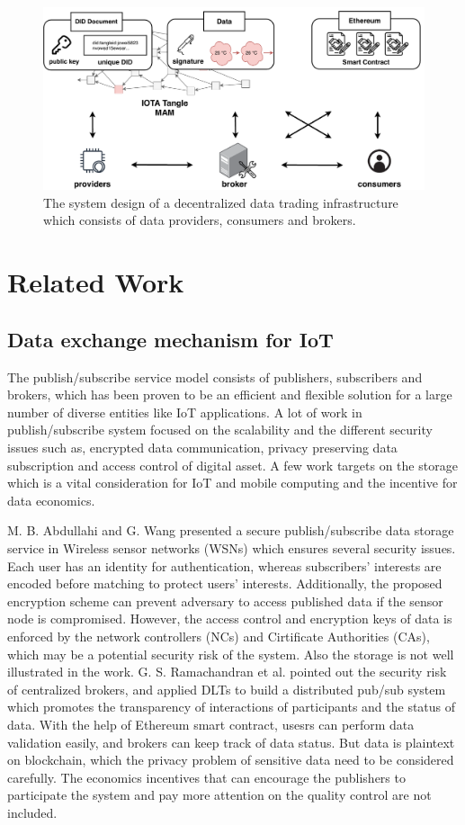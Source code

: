 \documentclass[conference]{IEEEtran}
\begin{document}
\begin{figure}[!t]
    \centering
    \includegraphics[width=3.in]{system_design}
    \caption{The system design of a decentralized data trading infrastructure which consists of data providers, consumers and brokers.}
    \label{fig:system_design}
\end{figure}

\section{Related Work}
\label{section:relatedWork}
\subsection{Data exchange mechanism for IoT}
The publish/subscribe service model consists of publishers, subscribers and brokers, which has been proven\cite{pubSubAnalysis, pubSubAnalysis2} to be an efficient and flexible solution for a large number of diverse entities like IoT applications. A lot of work in publish/subscribe system focused on the scalability and the different security issues such as, encrypted data communication, privacy preserving data subscription and access control of digital asset. A few work targets on the storage which is a vital consideration for IoT and mobile computing and the incentive for data economics.

M. B. Abdullahi and G. Wang\cite{centralPubSub} presented a secure publish/subscribe data storage service in Wireless sensor networks (WSNs) which ensures several security issues. Each user has an identity for authentication, whereas subscribers' interests are encoded before matching to protect users' interests. Additionally, the proposed encryption scheme can prevent adversary to access published data if the sensor node is compromised. However, the access control and encryption keys of data is enforced by the network controllers (NCs) and Cirtificate Authorities (CAs), which may be a potential security risk of the system. Also the storage is not well illustrated in the work. G. S. Ramachandran et al.\cite{trinity} pointed out the security risk of centralized brokers, and applied DLTs to build a distributed pub/sub system which promotes the transparency of interactions of participants and the status of data. With the help of Ethereum smart contract, usesrs can perform data validation easily, and brokers can keep track of data status. But data is plaintext on blockchain, which the privacy problem of sensitive data need to be considered carefully. The economics incentives that can encourage the publishers to participate the system and pay more attention on the quality control are not included. 
\end{document}
